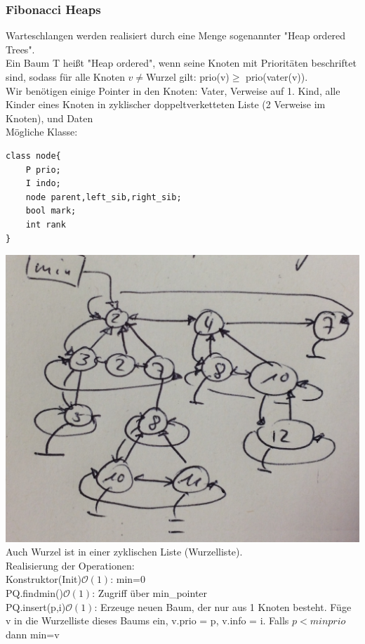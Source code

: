 \documentclass[a4paper]{article}
\newcommand{\oh}[1]{$\mathcal{O}(#1)$}
\begin{document}
\subsubsection{Fibonacci Heaps}
Warteschlangen werden realisiert durch eine Menge sogenannter "Heap ordered Trees".\\
Ein Baum T heißt "Heap ordered", wenn seine Knoten mit Prioritäten beschriftet sind, sodass  für alle Knoten $v\neq $Wurzel gilt: prio(v)$\geq$ prio(vater(v)).\\
Wir benötigen einige Pointer in den Knoten: Vater, Verweise auf 1. Kind, alle Kinder eines Knoten in zyklischer doppeltverketteten Liste (2 Verweise im Knoten), und Daten\\
Mögliche Klasse:\\
\begin{lstlisting}
class node{
	P prio;
	I indo;
	node parent,left_sib,right_sib;
	bool mark;
	int rank
}
\end{lstlisting}
\includegraphics[scale=0.1]{7.png}\\
Auch Wurzel ist in einer zyklischen Liste (Wurzelliste).\\
Realisierung der Operationen:\\
Konstruktor(Init)\oh{1}: min=0\\
PQ.findmin()\oh{1}: Zugriff über min\_pointer\\
PQ.insert(p,i)\oh{1}:  Erzeuge neuen Baum, der nur aus 1 Knoten besteht. Füge v in die Wurzelliste dieses Baums ein, v.prio = p, v.info = i. Falls $p<minprio$ dann min=v\\
\end{document}
